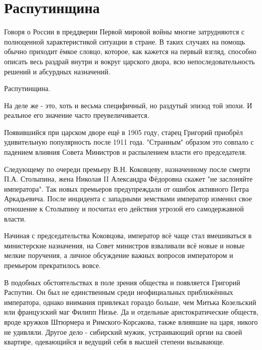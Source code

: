 
\chapter{Распутинщина}


Говоря о России в преддверии Первой мировой войны многие затрудняются с полноценной характеристикой ситуации в стране. В таких случаях на помощь обычно приходит ёмкое словцо, которое, как кажется на первый взгляд, способно описать весь раздрай внутри и вокруг царского двора, всю непоследовательность решений и абсурдных назначений.

Распутинщина.

На деле же - это, хоть и весьма специфичный, но раздутый эпизод той эпохи. И реальное его значение часто преувеличивается.

Появившийся при царском дворе ещё в 1905 году, старец Григорий приобрёл удивительную популярность после 1911 года. "Странным" образом это совпало с падением влияния Совета Министров и распылением власти его председателя.

Следующему по очереди премьеру В.Н. Коковцеву, назначенному после смерти П.А. Столыпина, жена Николая II Александра Фёдоровна скажет "не заслоняйте императора". Так новых премьеров предупреждали от ошибок активного Петра Аркадьевича. После инцидента с западными земствами император изменил свое отношение к Столыпину и посчитал его действия угрозой его самодержавной власти.

Начиная с председательства Коковцова, император всё чаще стал вмешиваться в министерские назначения, на Совет министров взваливали всё новые и новые мелкие поручения, а личное обсуждение важных вопросов императором и премьером прекратилось вовсе.

В подобных обстоятельствах в поле зрения общества и появляется Григорий Распутин. Он был не единственным среди неофициальных приближённых императора, однако внимания привлекал гораздо больше, чем Митька Козельский или французский маг Филипп Низье. Да и отдельные аристократические обществ, вроде кружков Штюрмера и Римского-Корсакова, также влиявшие на царя, никого не удивляли. Другое дело - сибирский мужик, устраивающий оргии на своей квартире, одевающийся и ведущий себя в высшей степени вызывающе. 


